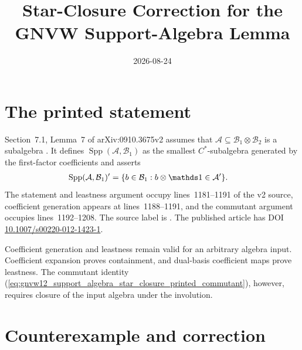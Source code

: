 \documentclass[11pt]{article}
\title{Star-Closure Correction for the GNVW Support-Algebra Lemma}
\author{}
\date{2026-08-24}
\begin{document}
\maketitle
{}

\section{The printed statement}

Section~7.1, Lemma~7 of arXiv:0910.3675v2 assumes that
$\mathcal A\subseteq\mathcal B_1\otimes\mathcal B_2$ is a subalgebra
\cite{Gross2012IndexTheory}. It defines
$\operatorname{Spp}(\mathcal A,\mathcal B_1)$ as the smallest
$C^*$-subalgebra generated by the first-factor coefficients and asserts
\begin{align}
    \operatorname{Spp}(\mathcal A,\mathcal B_1)'
        &=\{b\in\mathcal B_1:
            b\otimes\Id\in\mathcal A'\}.
    \label{eq:gnvw12_support_algebra_star_closure_printed_commutant}
\end{align}
The statement and leastness argument occupy lines~1181--1191 of the v2
source, coefficient generation appears at lines~1188--1191, and the
commutant argument occupies lines~1192--1208. The source label is
. The published article has DOI
\href{https://doi.org/10.1007/s00220-012-1423-1}
{10.1007/s00220-012-1423-1}.

Coefficient generation and leastness remain valid for an arbitrary algebra
input. Coefficient expansion proves containment, and dual-basis coefficient
maps prove leastness. The commutant identity
(\ref{eq:gnvw12_support_algebra_star_closure_printed_commutant}), however,
requires closure of the input algebra under the involution.

\section{Counterexample and correction}
\end{document}

